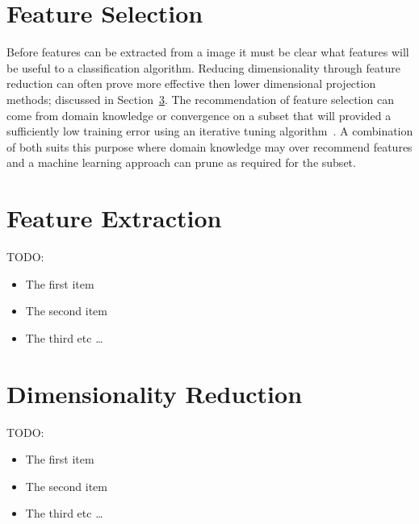 \documentclass[journal]{IEEEtran}
\begin{document}
\section{Feature Selection}
\label{sec:selection}
Before features can be extracted from a image it must be clear what features will be useful to a classification algorithm.
Reducing dimensionality through feature reduction can often prove more effective then lower dimensional projection methods; discussed in Section~\ref{sec:reduce}.
The recommendation of feature selection can come from domain knowledge or convergence on a subset that will provided a sufficiently low training error using an iterative tuning algorithm~\cite{bu07feature,li10tumor}.
A combination of both suits this purpose where domain knowledge may over recommend features and a machine learning approach can prune as required for the subset.  










\section{Feature Extraction}
\label{sec:extraction}


TODO:


\begin{itemize}
  \item The first item
  \item The second item
  \item The third etc \ldots
\end{itemize}






\section{Dimensionality Reduction}
\label{sec:reduce}





TODO:


\begin{itemize}
  \item The first item
  \item The second item
  \item The third etc \ldots
\end{itemize}
\end{document}
